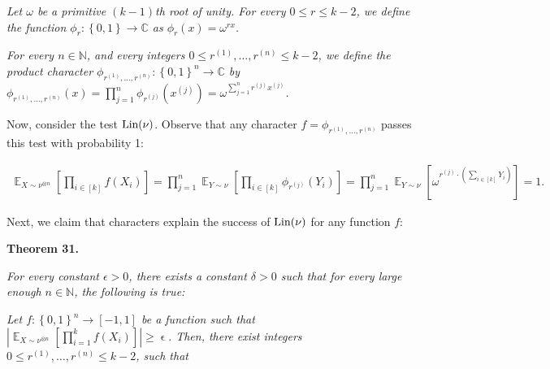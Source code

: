 \emph{Let $\omega$ be a primitive $(k-1)$th root of unity.
For every $0\leqslant r\leqslant k-2$, we define the function $\phi_{r}:\left\{0,1\right\}\to\mathbb{C}$ as $\phi_{r}(x)=\omega^{rx}$.}\par




\emph{For every $n\in\mathbb{N}$, and every integers $0\leqslant r^{\left(1\right)},\dots,r^{\left(n\right)}\leqslant k-2$, we define the product character $\phi_{r^{\left(1\right)},\dots,r^{\left(n\right)}}:\left\{0,1\right\}^{n}\to\mathbb{C}$ by $\phi_{r^{\left(1\right)},\dots,r^{\left(n\right)}}(x)=\prod_{j=1}^{n}\phi_{r^{\left(j\right)}}(x^{\left(j\right)})=\omega^{\sum_{j=1}^{n}r^{\left(j\right)}x^{\left(j\right)}}$.}\par






Now, consider the test $\textnormal{Lin}(\nu)$.
Observe that any character $f=\phi_{r^{\left(1\right)},\dots,r^{\left(n\right)}}$ passes this test with probability 1:\par


\[\begin{gathered}
\mathop{\mathbb{E}}_{X\sim\nu^{\otimes n}}\left[\prod_{i\in[k]}f(X_{i})\right]=\prod_{j=1}^{n}\mathop{\mathbb{E}}_{Y\sim\nu}\left[\prod_{i\in[k]}\phi_{r^{\left(j\right)}}(Y_{i})\right]=\prod_{j=1}^{n}\mathop{\mathbb{E}}_{Y\sim\nu}\left[\omega^{r^{\left(j\right)}\cdot\left(\sum_{i\in[k]}{Y_{i}}\right)}\right]=1.
\end{gathered}\]


Next, we claim that characters explain the success of $\textnormal{Lin}(\nu)$ for any function $f$:\par





\par\medskip\noindent\textbf{
\textbf{Theorem 31}\textbf{.}
}\par



\emph{For every constant $\epsilon>0$, there exists a constant $\delta>0$ such that for every large enough $n\in\mathbb{N}$, the following is true:}\par




\emph{Let $f:\left\{0,1\right\}^{n}\to[-1,1]$ be a function such that $\left|\mathop{\mathbb{E}}_{X\sim\nu^{\otimes n}}\left[\prod_{i=1}^{k}f(X_{i})\right]\right|\geqslant\mathop{\epsilon}.$
Then, there exist integers $0\leqslant r^{\left(1\right)},\dots,r^{\left(n\right)}\leqslant k-2$, such that}\par


